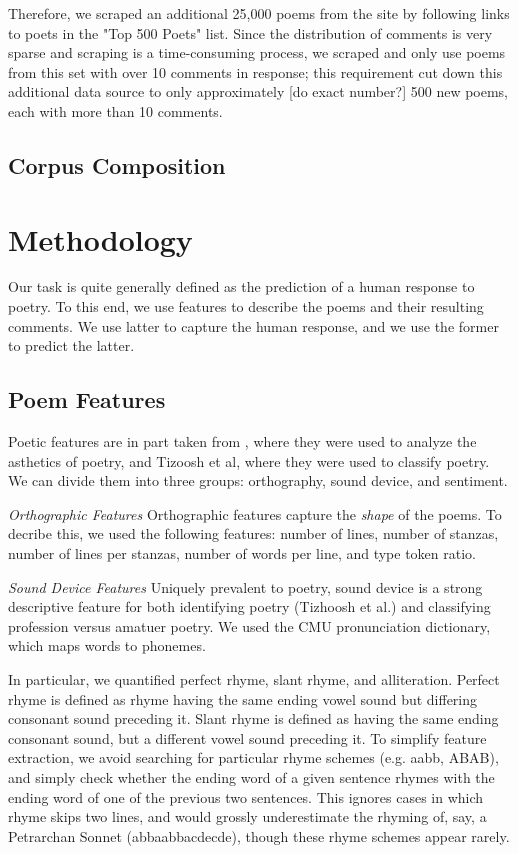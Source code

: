 \documentclass[11pt]{article}
\begin{document}
Therefore, we scraped an additional 25,000 poems from the site by following links to poets in the "Top 500 Poets" list. Since the distribution of comments is very sparse and scraping is a time-consuming process, we scraped and only use poems from this set with over 10 comments in response; this requirement cut down this additional data source to only approximately [do exact number?] 500 new poems, each with more than 10 comments.

\subsection*{Corpus Composition}

\section{Methodology}
Our task is quite generally defined as the prediction of a human response to poetry. To this end, we use features to describe the poems and their resulting comments. We use latter to capture the human response, and we use the former to predict the latter.

\subsection*{Poem Features}
Poetic features are in part taken from , where they were used to analyze the asthetics of poetry, and Tizoosh et al, where they were used to classify poetry. We can divide them into three groups: orthography, sound device, and sentiment.

\emph{Orthographic Features}
Orthographic features capture the \emph{shape} of the poems. To decribe this, we used the following features: number of lines, number of stanzas, number of lines per stanzas, number of words per line, and type token ratio.

\emph{Sound Device Features}
Uniquely prevalent to poetry, sound device is a strong descriptive feature for both identifying poetry (Tizhoosh et al.) and classifying profession versus amatuer poetry. We used the CMU pronunciation dictionary, which maps words to phonemes.

In particular, we quantified perfect rhyme, slant rhyme, and alliteration. Perfect rhyme is defined as rhyme having the same ending vowel sound but differing consonant sound preceding it. Slant rhyme is defined as having the same ending consonant sound, but a different vowel sound preceding it. To simplify feature extraction, we avoid searching for particular rhyme schemes (e.g. aabb, ABAB), and simply check whether the ending word of a given sentence rhymes with the ending word of one of the previous two sentences. This ignores cases in which rhyme skips two lines, and would grossly underestimate the rhyming of, say, a Petrarchan Sonnet (abbaabbacdecde), though these rhyme schemes appear rarely.
\end{document}
